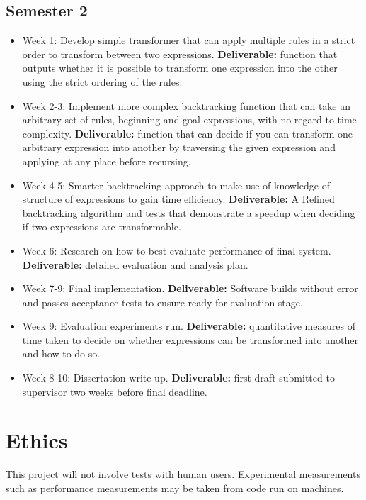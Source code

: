 \documentclass[11pt]{article}
\begin{document}
\subsection{Semester 2}

\begin{itemize}
    \tightlist
    \item
      Week 1: Develop simple transformer that can apply multiple rules in a strict order to transform between two expressions. \textbf{Deliverable:}
      function that outputs whether it is possible to transform one expression into the other using the strict ordering of the rules.
    \item
      Week 2-3: Implement more complex backtracking function that can take an arbitrary set of rules, beginning and goal expressions, with no regard to time complexity. 
      \textbf{Deliverable:}
      function that can decide if you can transform one arbitrary expression into another by traversing the given expression and applying at any place before recursing. 
    \item
      Week 4-5: Smarter backtracking approach to make use of knowledge of structure of expressions to gain time efficiency. 
      \textbf{Deliverable:} 
      A Refined backtracking algorithm and tests that demonstrate a speedup when deciding if two expressions are transformable.
    \item
      Week 6: Research on how to best evaluate performance of final system.
      \textbf{Deliverable:} 
      detailed evaluation and analysis plan.
    \item
      Week 7-9: Final implementation.
      \textbf{Deliverable:}
      Software builds without error and passes acceptance tests to ensure ready for evaluation stage.
    \item
      Week 9: Evaluation experiments run. 
      \textbf{Deliverable:}
      quantitative measures of time taken to decide on whether expressions can be transformed into another and how to do so.
    \item
      Week 8-10: Dissertation write up.
      \textbf{Deliverable:}
      first draft submitted to supervisor two weeks before final deadline.
    \end{itemize}
    

\section{Ethics}

This project will not involve tests with human users.  Experimental measurements such as performance measurements may be taken from code run on machines. 
\end{document}
